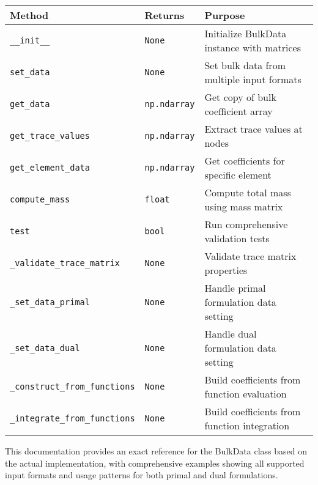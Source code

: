 \begin{longtable}{|p{5cm}|p{2cm}|p{7cm}|}
\hline
\textbf{Method} & \textbf{Returns} & \textbf{Purpose} \\
\hline
\endhead

\texttt{\_\_init\_\_} & \texttt{None} & Initialize BulkData instance with matrices \\
\hline

\texttt{set\_data} & \texttt{None} & Set bulk data from multiple input formats \\
\hline

\texttt{get\_data} & \texttt{np.ndarray} & Get copy of bulk coefficient array \\
\hline

\texttt{get\_trace\_values} & \texttt{np.ndarray} & Extract trace values at nodes \\
\hline

\texttt{get\_element\_data} & \texttt{np.ndarray} & Get coefficients for specific element \\
\hline

\texttt{compute\_mass} & \texttt{float} & Compute total mass using mass matrix \\
\hline

\texttt{test} & \texttt{bool} & Run comprehensive validation tests \\
\hline

\texttt{\_validate\_trace\_matrix} & \texttt{None} & Validate trace matrix properties \\
\hline

\texttt{\_set\_data\_primal} & \texttt{None} & Handle primal formulation data setting \\
\hline

\texttt{\_set\_data\_dual} & \texttt{None} & Handle dual formulation data setting \\
\hline

\texttt{\_construct\_from\_functions} & \texttt{None} & Build coefficients from function evaluation \\
\hline

\texttt{\_integrate\_from\_functions} & \texttt{None} & Build coefficients from function integration \\
\hline

\end{longtable}

This documentation provides an exact reference for the BulkData class based on the actual implementation, with comprehensive examples showing all supported input formats and usage patterns for both primal and dual formulations.

